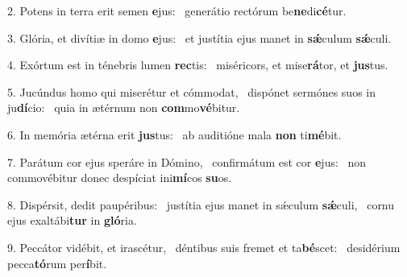 2. Potens in terra erit semen \textbf{e}jus: \ast\  generátio rectórum be\textbf{ne}di\textbf{cé}tur.\

3. Glória, et divítiæ in domo \textbf{e}jus: \ast\  et justítia ejus manet in \textbf{sǽ}culum \textbf{sǽ}culi.\

4. Exórtum est in ténebris lumen \textbf{rec}tis: \ast\  miséricors, et mise\textbf{rá}tor, et \textbf{jus}tus.\

5. Jucúndus homo qui miserétur et cómmodat, \dag\  dispónet sermónes suos in ju\textbf{dí}cio: \ast\  quia in ætérnum non \textbf{com}mo\textbf{vé}bitur.\

6. In memória ætérna erit \textbf{jus}tus: \ast\  ab auditióne mala \textbf{non} ti\textbf{mé}bit.\

7. Parátum cor ejus speráre in Dómino, \dag\  confirmátum est cor \textbf{e}jus: \ast\  non commovébitur donec despíciat ini\textbf{mí}cos \textbf{su}os.\

8. Dispérsit, dedit paupéribus: \dag\  justítia ejus manet in sǽculum \textbf{sǽ}culi, \ast\  cornu ejus exaltábi\textbf{tur} in \textbf{gló}ria.\

9. Peccátor vidébit, et irascétur, \dag\  déntibus suis fremet et ta\textbf{bé}scet: \ast\  desidérium pecca\textbf{tó}rum per\textbf{í}bit.\

